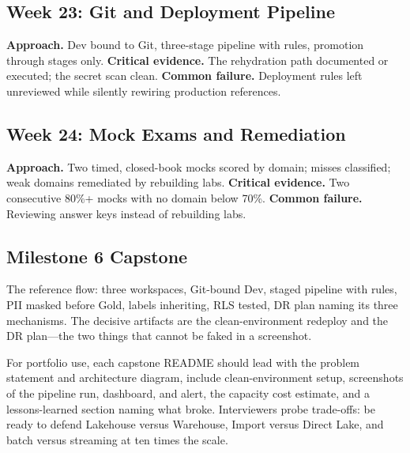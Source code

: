 \subsection{Week 23: Git and Deployment Pipeline}
\textbf{Approach.} Dev bound to Git, three-stage pipeline with rules, promotion through stages
only. \textbf{Critical evidence.} The rehydration path documented or executed; the secret scan
clean. \textbf{Common failure.} Deployment rules left unreviewed while silently rewiring
production references.

\subsection{Week 24: Mock Exams and Remediation}
\textbf{Approach.} Two timed, closed-book mocks scored by domain; misses classified; weak domains
remediated by rebuilding labs. \textbf{Critical evidence.} Two consecutive 80\%+ mocks with no
domain below 70\%. \textbf{Common failure.} Reviewing answer keys instead of rebuilding labs.

\subsection{Milestone 6 Capstone}
The reference flow: three workspaces, Git-bound Dev, staged pipeline with rules, PII masked before
Gold, labels inheriting, RLS tested, DR plan naming its three mechanisms. The decisive artifacts
are the clean-environment redeploy and the DR plan---the two things that cannot be faked in a
screenshot.

\begin{tipbox}
For portfolio use, each capstone README should lead with the problem statement and architecture
diagram, include clean-environment setup, screenshots of the pipeline run, dashboard, and alert,
the capacity cost estimate, and a lessons-learned section naming what broke. Interviewers probe
trade-offs: be ready to defend Lakehouse versus Warehouse, Import versus Direct Lake, and batch
versus streaming at ten times the scale.
\end{tipbox}
